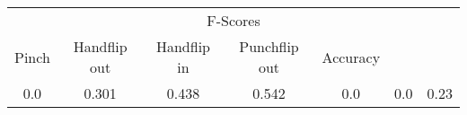 \documentclass{standalone}
\begin{document}
 
 \begin{tabular}{|c|c|c|c|c|c ||c|}
\cline{1-7}\multicolumn{7}{|c|}{F-Scores} \\ 
\cline{1-7}Pinch & Handflip out & Handflip in & Punchflip out & Accuracy\\ 
\cline{1-7}0.0 & 0.301 & 0.438 & 0.542 & 0.0 & 0.0 & 0.23\\ 
 \cline{1-7}\hline \end{tabular}
 
\end{document}
